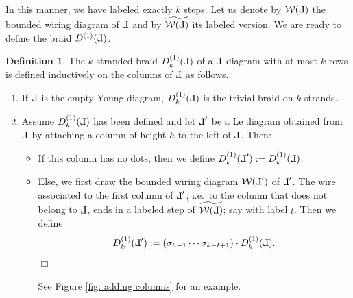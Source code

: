 \documentclass[10pt]{amsart}
\theoremstyle{plain}
\theoremstyle{definition}
\newtheorem{definition}[thm]{Definition}
\theoremstyle{remark}
\numberwithin{equation}{section}
\newcommand{\wire}[1]{\mathcal{W}(#1)}
\newcommand{\MG}[1]{{\color{teal}{{\bf Misha}: #1}}}
\def\Le{\reflectbox{$\mathrm{L}$}}
\begin{document}
\noindent In this manner, we have labeled exactly $k$ steps. Let us denote by $\wire{\Le}$ the bounded wiring diagram of $\Le$ and by $\widetilde{\wire{\Le}}$ its labeled version.  We are ready to define the braid $D^{(1)}(\Le)$.

\begin{definition}
The $k$-stranded braid $D_{k}^{(1)}(\Le)$ of a $\Le$ diagram with at most $k$ rows is defined inductively on the columns of $\Le$ as follows.
\begin{enumerate}
\item If $\Le$ is the empty Young diagram, $D_{k}^{(1)}(\Le)$ is the trivial braid on $k$ strands.\\
\item Assume $D_{k}^{(1)}(\Le)$ has been defined and let $\Le'$ be a Le diagram obtained from $\Le$ by attaching a column of height $h$ to the left of $\Le$. Then:

\begin{itemize}
    \item[(i)] If this column has no dots, then we define $D^{(1)}_{k}(\Le') := D^{(1)}_{k}(\Le)$.\\

    \item[(ii)] Else, we first draw the bounded wiring diagram $\wire{\Le'}$ of $\Le'$. The wire associated to the first column of $\Le'$, i.e.~to the column that does not belong to $\Le$, ends in a labeled step of $\widetilde{\wire{\Le}}$; say with label $t$. 
    Then we define
\[
D^{(1)}_{k}(\Le') := (\sigma_{h-1}\cdots \sigma_{k-t+1})\cdot D^{(1)}_{k}(\Le). 
\]
\hfill$\Box$

See Figure \ref{fig: adding columns} for an example. 
\end{itemize}
\end{enumerate}
\end{definition}
\end{document}
